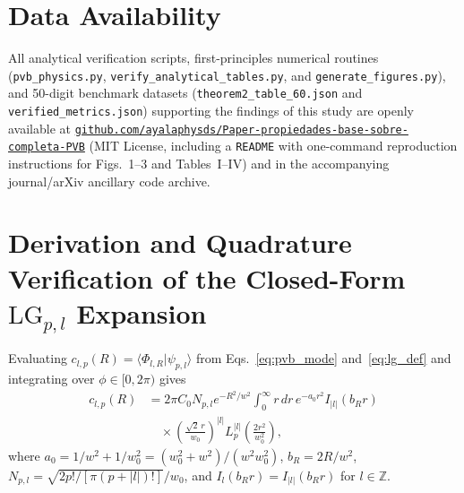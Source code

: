 \documentclass[aps,pra,onecolumn,notitlepage,11pt,tightenlines,nofootinbib,floatfix,longbibliography]{revtex4-2}
\theoremstyle{remark}
\newcommand{\braket}[2]{\langle #1 | #2 \rangle}
\newcommand{\abs}[1]{\lvert #1 \rvert}
\begin{document}
\section*{Data Availability}
{\sloppy All analytical verification scripts, first-principles numerical routines (\texttt{pvb\_\allowbreak physics.py}, \texttt{verify\_\allowbreak analytical\_\allowbreak tables.py}, and \texttt{generate\_\allowbreak figures.py}), and 50-digit benchmark datasets (\texttt{theorem2\_\allowbreak table\_\allowbreak 60.json} and \texttt{verified\_\allowbreak metrics.json}) supporting the findings of this study are openly available at \href{https://github.com/ayalaphysds/Paper-propiedades-base-sobre-completa-PVB}{\texttt{github.com/\allowbreak ayalaphysds/\allowbreak Paper-\allowbreak propiedades-\allowbreak base-\allowbreak sobre-\allowbreak completa-\allowbreak PVB}} (MIT License, including a \texttt{README} with one-command reproduction instructions for Figs.~1--3 and Tables~I--IV) and in the accompanying journal/arXiv ancillary code archive.\par}

\appendix

\section{Derivation and Quadrature Verification of the Closed-Form \texorpdfstring{$\mathrm{LG}_{p,l}$}{LG\_\{p,l\}} Expansion}
\label{app:lg_expansion}

Evaluating $c_{l,p}(R) = \braket{\Phi_{l,R}}{\psi_{p,l}}$ from Eqs.~\eqref{eq:pvb_mode} and~\eqref{eq:lg_def} and integrating over $\phi \in [0,2\pi)$ gives
\begin{align}
c_{l,p}(R) &= 2\pi C_0 N_{p,l} e^{-R^2/w^2} \int_0^\infty r\,dr\, e^{-a_0 r^2} I_{\abs{l}}(b_R r) \nonumber \\
&\quad \times \left(\frac{\sqrt{2}\,r}{w_0}\right)^{\abs{l}} L_p^{\abs{l}}\!\left(\frac{2r^2}{w_0^2}\right),
\label{eq:app_c_int}
\end{align}
where $a_0 = 1/w^2 + 1/w_0^2 = (w_0^2+w^2)/(w^2 w_0^2)$, $b_R = 2R/w^2$, $N_{p,l} = \sqrt{2p!/[\pi(p+\abs{l})!]}/w_0$, and $I_l(b_R r) = I_{\abs{l}}(b_R r)$ for $l \in \mathbb{Z}$.
\end{document}
